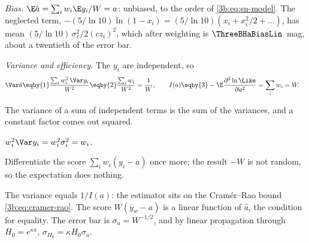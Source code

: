 \emph{Bias.} $\E\hat a=\sum_iw_i\E y_i/W=a$: unbiased, to the order of
\eqref{3b:eq:sn-model}. The neglected term, $-(5/\ln10)\ln(1-x_i)=(5/\ln10)(x_i+x_i^2/2+\dots)$,
has mean $(5/\ln10)\,\sigma_v^2/2(cz_i)^2$, which after weighting is
$\ThreeBHaBiasLin$~mag, about a twentieth of the error bar.

\emph{Variance and efficiency.} The $y_i$ are independent, so
\begin{align}
  \Var\hat a
  &\eqby{1}\frac{\sum_iw_i^2\,\Var y_i}{W^2}
   \eqby{2}\frac{\sum_iw_i}{W^2}=\frac1W,
  \qquad
  I(a)\eqby{3}-\E\frac{\partial^2\ln\Like}{\partial a^2}=\sum_iw_i=W .
  \label{3b:eq:hubble-fisher}
\end{align}
\begin{explain}
  \item The variance of a sum of independent terms is the sum of the variances,
        and a constant factor comes out squared.
  \item $w_i^2\Var y_i=w_i^2\sigma_i^2=w_i$.
  \item Differentiate the score $\sum_iw_i(y_i-a)$ once more; the result
        $-W$ is not random, so the expectation does nothing.
\end{explain}
The variance equals $1/I(a)$: the estimator sits on the Cram\'er--Rao bound
\eqref{3b:eq:cramer-rao}. The score $W(\bar y_w-a)$ is a linear function of
$\hat a$, the condition for equality. The error bar is
$\sigma_a=W^{-1/2}$, and by linear propagation through $H_0=e^{\kappa a}$,
$\sigma_{H_0}=\kappa H_0\sigma_a$.

